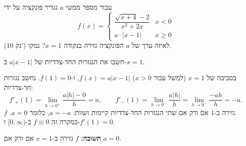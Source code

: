 
\begin{question}
עבור מספר ממשי $a$ נגדיר פונקציה על ידי
\[ f(x) = \begin{cases} \dfrac{\sqrt{x+4} - 2}{x^2 + 2x} & x < 0 \\ a\cdot|x - 1| & x \ge 0 \end{cases} \]
(10 נק') לאיזה ערך של $a$ הפונקציה גזירה בנקודה $x = 1$? נמקו.
\end{question}

\begin{hint}
חשבו את הנגזרות החד-צדדיות של $a|x-1|$ ב-$x=1$.
\end{hint}

\begin{solution}
בסביבה של $x = 1$ (למשל עבור $x>0$) $f(x) = a|x - 1|$, ו-$f(1) = 0$. נחשב נגזרות חד-צדדיות:
\[ f'_+(1) = \lim_{h\to0^+}\frac{a|h| - 0}{h} = a, \qquad f'_-(1) = \lim_{h\to0^-}\frac{a|h|}{h} = \lim_{h\to 0^-}\frac{-ah}{h} = -a. \]
$f$ גזירה ב-$1$ אם ורק אם שתי הנגזרות החד-צדדיות קיימות ושוות: $a = -a$, כלומר $a = 0$.
במקרה זה $f \equiv 0$ ב-$[0,\infty)$ ו-$f'(1) = 0$.

\textbf{תשובה:} $f$ גזירה ב-$x=1$ אם ורק אם $a = 0$.
\end{solution}
